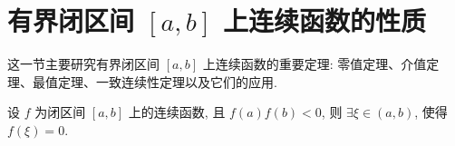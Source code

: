 \section{有界闭区间 $[a,b]$ 上连续函数的性质}\label{sec:2.5}

这一节主要研究有界闭区间 $[a,b]$ 上连续函数的重要定理: 零值定理、介值定理、最值定理、一致连续性定理以及它们的应用.

\begin{theorem}\label{thm:2.5.1}
设 $f$ 为闭区间 $[a,b]$ 上的连续函数, 且 $f(a)f(b) < 0$, 则 $\exists \xi \in (a,b)$, 使得 $f(\xi) = 0$.
\end{theorem}


